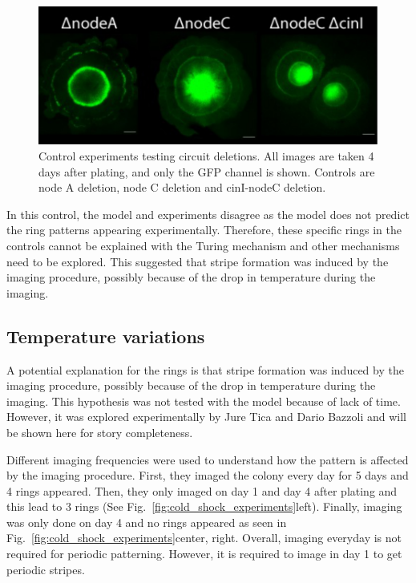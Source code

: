 \begin{figure}[H] %
    \centering
    \begin{adjustbox}{center}
        \includegraphics[width=1.1\textwidth]{chapters/Chapter 3/experimental_node_dele} %
    \end{adjustbox}
    \caption{Control experiments testing circuit deletions. All images are taken 4 days after plating, and only the GFP channel is shown. Controls are node A deletion, node C deletion and cinI-nodeC deletion.}
    \label{fig:experimental_node_dele}
\end{figure}

In this control, the model and experiments disagree as the model does not predict the ring patterns appearing experimentally.
Therefore, these specific rings in the controls cannot be explained with the Turing mechanism and other mechanisms need to be explored.
This suggested that stripe formation was induced by the imaging procedure, possibly because of the drop in temperature during the imaging.
\subsection{Temperature variations}
A potential explanation for the rings is that stripe formation was induced by the imaging procedure, possibly because of the drop in temperature during the imaging.
This hypothesis was not tested with the model because of lack of time.
However, it was explored experimentally by Jure Tica and Dario Bazzoli and will be shown here for story completeness.

Different imaging frequencies were used to understand how the pattern is affected by the imaging procedure.
First, they imaged the colony every day for 5 days and 4 rings appeared.
Then, they only imaged on day 1 and day 4 after plating and this lead to 3 rings (See Fig.~\ref{fig:cold_shock_experiments}left).
Finally, imaging was only done on day 4 and no rings appeared as seen in Fig.~\ref{fig:cold_shock_experiments}center, right.
Overall, imaging everyday is not required for periodic patterning.
However, it is required to image in day 1 to get periodic stripes.



